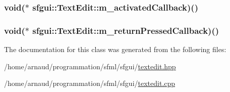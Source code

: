 \hypertarget{classsfgui_1_1TextEdit_9cf910f9fca635f595d6a8963d7e30d1}{
\subsubsection[m\_\-activatedCallback]{\setlength{\rightskip}{0pt plus 5cm}void($\ast$ {\bf sfgui::TextEdit::m\_\-activatedCallback})()}}
\label{classsfgui_1_1TextEdit_9cf910f9fca635f595d6a8963d7e30d1}


\hypertarget{classsfgui_1_1TextEdit_d86f9eaadf1313214631b2de009abf55}{
\subsubsection[m\_\-returnPressedCallback]{\setlength{\rightskip}{0pt plus 5cm}void($\ast$ {\bf sfgui::TextEdit::m\_\-returnPressedCallback})()}}
\label{classsfgui_1_1TextEdit_d86f9eaadf1313214631b2de009abf55}




The documentation for this class was generated from the following files:\begin{CompactItemize}
\item 
/home/arnaud/programmation/sfml/sfgui/\hyperlink{textedit_8hpp}{textedit.hpp}\item 
/home/arnaud/programmation/sfml/sfgui/\hyperlink{textedit_8cpp}{textedit.cpp}\end{CompactItemize}
